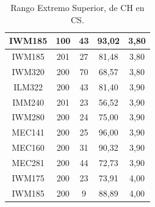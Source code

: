 \documentclass[12pt]{article}
\begin{document}
\begin{table}[H]
{{\begin{minipage}[b]{.5\hsize}
\begin{tabular}{|c|c|c|c|c|}
            IWM185 & 100 & 43 & 93,02 & 3,80 \\ \hline
            \rowcolor[HTML]{DAEBFB} 
            IWM185 & 201 & 27 & 81,48 & 3,80 \\ \hline
            \rowcolor[HTML]{DAEBFB} 
            IWM320 & 200 & 70 & 68,57 & 3,80 \\ \hline
            \rowcolor[HTML]{DAEBFB} 
            ILM322 & 200 & 43 & 81,40 & 3,90 \\ \hline
            \rowcolor[HTML]{DAEBFB} 
            IMM240 & 201 & 23 & 56,52 & 3,90 \\ \hline
            \rowcolor[HTML]{DAEBFB} 
            IWM280 & 200 & 24 & 75,00 & 3,90 \\ \hline
            \rowcolor[HTML]{DAEBFB} 
            MEC141 & 200 & 25 & 96,00 & 3,90 \\ \hline
            \rowcolor[HTML]{DAEBFB} 
            MEC160 & 200 & 31 & 90,32 & 3,90 \\ \hline
            \rowcolor[HTML]{DAEBFB} 
            MEC281 & 200 & 44 & 72,73 & 3,90 \\ \hline
            \rowcolor[HTML]{DAEBFB} 
            IWM175 & 200 & 23 & 73,91 & 4,00 \\ \hline
            \rowcolor[HTML]{DAEBFB} 
            IWM185 & 200 & 9 & 88,89 & 4,00 \\ \hline
        \end{tabular}
        \caption{Rango Extremo Superior, de CH en CS.}
    \end{minipage}\hfil
    \hfill
    \begin{minipage}[b]{.5\hsize}\centering
\end{minipage}}}
\end{table}
\end{document}
